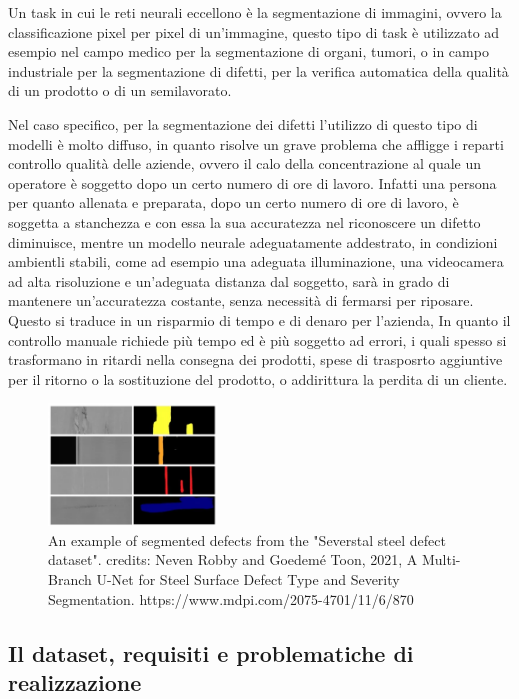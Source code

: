 Un task in cui le reti neurali eccellono è la segmentazione di immagini, ovvero la classificazione pixel per pixel di un'immagine,
questo tipo di task è utilizzato ad esempio nel campo medico per la segmentazione di organi, tumori, o in campo industriale per la segmentazione di difetti,
per la verifica automatica della qualità di un prodotto o di un semilavorato.

Nel caso specifico, per la segmentazione dei difetti l'utilizzo di questo tipo di modelli è molto diffuso, in quanto risolve un grave problema 
che affligge i reparti controllo qualità delle aziende, ovvero il calo della concentrazione al quale un operatore è soggetto dopo un certo numero di ore di lavoro.
Infatti una persona per quanto allenata e preparata, dopo un certo numero di ore di lavoro, è soggetta a stanchezza e con essa
la sua accuratezza nel riconoscere un difetto diminuisce, mentre un modello neurale adeguatamente addestrato, in condizioni ambientli stabili,
come ad esempio una adeguata illuminazione, una videocamera ad alta risoluzione e un'adeguata distanza dal soggetto, sarà in grado di mantenere 
un'accuratezza costante, senza necessità di fermarsi per riposare. Questo si traduce in un risparmio di tempo e di denaro per l'azienda,
In quanto il controllo manuale richiede più tempo ed è più soggetto ad errori, i quali spesso si trasformano in ritardi nella consegna dei prodotti,
spese di trasposrto aggiuntive per il ritorno o la sostituzione del prodotto, o addirittura la perdita di un cliente.

\begin{figure}[H]
    \centering
    \includegraphics[width=0.4\textwidth]{imgs/segm_example_1_crop.png}
    \caption{An example of segmented defects from the "Severstal steel defect dataset".
    credits: Neven Robby and Goedemé Toon, 2021, A Multi-Branch U-Net for Steel Surface Defect Type and Severity Segmentation.
    https://www.mdpi.com/2075-4701/11/6/870}
    \label{fig:segm_example_1}
\end{figure}


\subsection{Il dataset, requisiti e problematiche di realizzazione \ok}

